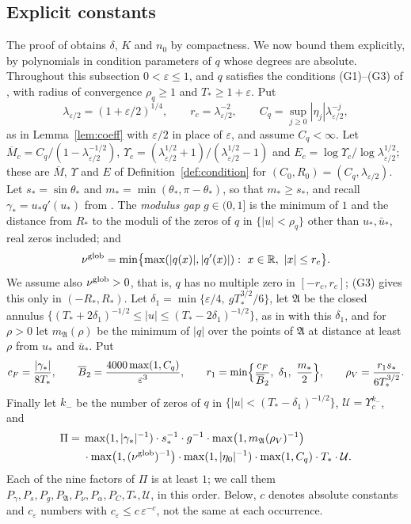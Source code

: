 \documentclass[11pt]{amsart}
\theoremstyle{definition}
\theoremstyle{remark}
\numberwithin{equation}{section}
\newcommand{\R}{\mathbb{R}}
\newcommand{\eps}{\varepsilon}
\begin{document}
\subsection{Explicit constants}\label{subsec:collision-explicit}
The proof of \cite[Theorem~\ref{M-thm:collision}]{Main} obtains $\delta$, $K$ and $n_0$ by compactness. We now bound them explicitly, by polynomials in condition parameters of $q$ whose degrees are absolute. Throughout this subsection $0<\eps\le1$, and $q$ satisfies the conditions (G1)--(G3) of \cite[Section~\ref{M-sec:collision}]{Main}, with radius of convergence $\rho_q\ge1$ and $T_*\ge1+\eps$. Put
\[
\lambda_{\eps/2}=(1+\eps/2)^{1/4},\qquad r_c=\lambda_{\eps/2}^{-2},\qquad C_q=\sup_{j\ge0}|\eta_j|\lambda_{\eps/2}^{-j},
\]
as in Lemma~\ref{lem:coeff} with $\eps/2$ in place of $\eps$, and assume $C_q<\infty$. Let $\overline M_c=C_q/(1-\lambda_{\eps/2}^{-1/2})$, $\Upsilon_c=(\lambda_{\eps/2}^{1/2}+1)/(\lambda_{\eps/2}^{1/2}-1)$ and $E_c=\log\Upsilon_c/\log\lambda_{\eps/2}^{1/2}$; these are $\overline M$, $\Upsilon$ and $E$ of Definition~\ref{def:condition} for $(C_0,R_0)=(C_q,\lambda_{\eps/2})$. Let $s_*=\sin\theta_*$ and $m_*=\min(\theta_*,\pi-\theta_*)$, so that $m_*\ge s_*$, and recall $\gamma_*=u_*q'(u_*)$ from \cite[Section~\ref{M-subsec:collision-limit}]{Main}. The \emph{modulus gap} $g\in(0,1]$ is the minimum of $1$ and the distance from $R_*$ to the moduli of the zeros of $q$ in $\{|u|<\rho_q\}$ other than $u_*,\bar u_*$, real zeros included; and
\[
\nu^{\rm glob}=\min\bigl\{\max(|q(x)|,|q'(x)|):\ x\in\R,\ |x|\le r_c\bigr\}.
\]
We assume also $\nu^{\rm glob}>0$, that is, $q$ has no multiple zero in $[-r_c,r_c]$; (G3) gives this only in $(-R_*,R_*)$. Let $\delta_1=\min\{\eps/4,\ gT_*^{3/2}/6\}$, let $\mathfrak A$ be the closed annulus $\{(T_*+2\delta_1)^{-1/2}\le|u|\le(T_*-2\delta_1)^{-1/2}\}$, as in \cite[Section~\ref{M-subsec:collision-limit}]{Main} with this $\delta_1$, and for $\rho>0$ let $m_{\mathfrak A}(\rho)$ be the minimum of $|q|$ over the points of $\mathfrak A$ at distance at least $\rho$ from $u_*$ and $\bar u_*$. Put
\[
c_F=\frac{|\gamma_*|}{8T_*},\qquad\overline B_2=\frac{4000\max(1,C_q)}{\eps^3},\qquad r_1=\min\Bigl\{\frac{c_F}{\overline B_2},\ \delta_1,\ \frac{m_*}2\Bigr\},\qquad\rho_V=\frac{r_1s_*}{6T_*^{3/2}} .
\]
Finally let $k_-$ be the number of zeros of $q$ in $\{|u|<(T_*-\delta_1)^{-1/2}\}$, $\mathcal U=\Upsilon_c^{k_-}$, and
\[
\begin{aligned}
\Pi={}&\max(1,|\gamma_*|^{-1})\cdot s_*^{-1}\cdot g^{-1}\cdot\max\bigl(1,m_{\mathfrak A}(\rho_V)^{-1}\bigr)\\
&\cdot\max\bigl(1,(\nu^{\rm glob})^{-1}\bigr)\cdot\max(1,|\eta_0|^{-1})\cdot\max(1,C_q)\cdot T_*\cdot\mathcal U .
\end{aligned}
\]
Each of the nine factors of $\Pi$ is at least $1$; we call them $P_\gamma,P_s,P_g,P_{\mathfrak A},P_\nu,P_\alpha,P_C,T_*,\mathcal U$, in this order. Below, $c$ denotes absolute constants and $c_\eps$ numbers with $c_\eps\le c\,\eps^{-c}$, not the same at each occurrence.
\end{document}
